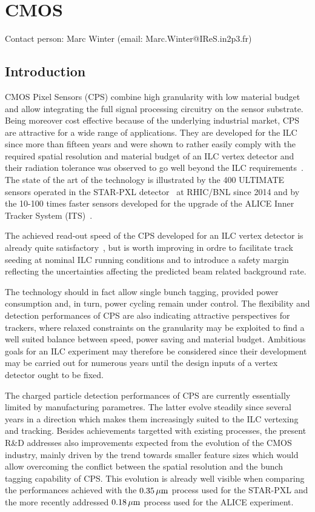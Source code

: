 \section{CMOS}
Contact person: Marc Winter (email: Marc.Winter@IReS.in2p3.fr)
\subsection{Introduction}
CMOS Pixel Sensors (CPS) combine high granularity with low material
budget and allow integrating the full signal processing circuitry on
the sensor substrate. Being moreover cost effective because of the
underlying industrial market, CPS are attractive for a wide range of
applications. They are developed for the ILC since more than fifteen
years and were shown to rather easily comply with the required spatial
resolution and material budget of an ILC vertex detector and their
radiation tolerance was observed to go well beyond the ILC requirements~\cite{Behnke:2013lya}. The state of the art of the technology is illustrated
by the 400 ULTIMATE sensors  operated in the STAR-PXL detector~\cite{Greiner201168}
at RHIC/BNL since 2014 and by the 10-100 times faster
sensors developed for the upgrade of the ALICE Inner Tracker System
(ITS)~\cite{0954-3899-41-8-087002}.

The achieved read-out speed of the CPS developed for an ILC
vertex detector is already quite satisfactory~\cite{Behnke:2013lya},
but is worth
improving in ordre to facilitate track seeding at nominal ILC
running conditions and to introduce a safety margin reflecting the
uncertainties affecting the predicted beam related background rate.

The technology should in fact allow single bunch tagging, provided power
consumption and, in turn, power cycling remain under control. The flexibility and detection performances of CPS are also indicating attractive perspectives for trackers, where relaxed constraints on the granularity may be exploited
to find a well suited balance between speed, power saving and material budget. Ambitious goals for an ILC experiment may therefore be considered
since their development may be carried out for numerous years until the design
inputs of a vertex detector ought to be fixed.

The charged particle detection performances of CPS are
currently essentially limited by manufacturing parametres.
The latter evolve steadily since several years in a direction which makes
them increasingly suited to the ILC vertexing and tracking. Besides
achievements targetted with existing processes, the present R\&D
addresses also improvements expected from the evolution of the CMOS
industry, mainly driven by the trend towards smaller feature sizes which
would allow overcoming the conflict between the spatial resolution and the
bunch tagging capability of CPS. This evolution is already well visible
when comparing the performances achieved with the $\unit[0.35]{\mu m}$ process
used for the STAR-PXL and the more recently addressed $\unit[0.18]{\mu m}$ process
used for the ALICE experiment.


